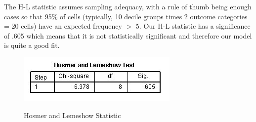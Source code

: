 \documentclass[a4paper,12pt]{article}
\begin{document}
The H-L statistic assumes sampling adequacy, with a rule of thumb being enough cases so that 95\% of cells (typically, 10 decile groups times 2 outcome categories = 20 cells) have an expected frequency $>$ 5. Our H-L statistic has a significance of .605 which means that it is not statistically significant and therefore our model is quite a
good fit.
\begin{figure}[h!]
	\begin{center}
		\includegraphics[scale=0.6]{images/Logistic7A}\\
		\caption{Hosmer and Lemeshow Statistic}
	\end{center}
\end{figure}
\end{document}
